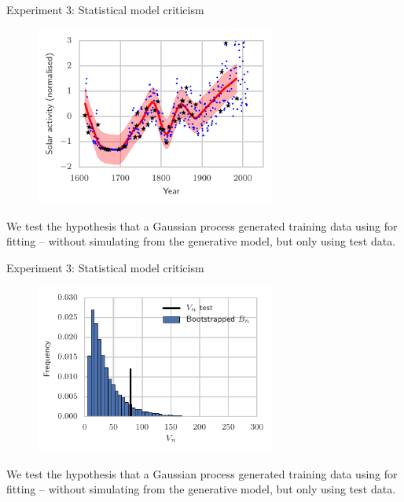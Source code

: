 \documentclass{beamer}
\begin{document}
    \begin{frame}{Experiment 3: Statistical model criticism}
        \begin{figure}
           \includegraphics[width= 0.7\textwidth]{img/gp_regression_data_fit.pdf}  
        \end{figure}
      We test the hypothesis that a Gaussian process generated {\color{red}training data} using for fitting -- without simulating from the generative model, but only using {\color{blue} test data}.
  \end{frame}


   \begin{frame}{Experiment 3: Statistical model criticism}
        \begin{figure}
           \includegraphics[width=0.7\textwidth]{img/gp_regression_bootstrap_hist} 
        \end{figure}
      We test the hypothesis that a Gaussian process generated {\color{red}training data} using for fitting -- without simulating from the generative model, but only using {\color{blue} test data}.

  \end{frame}
\end{document}
